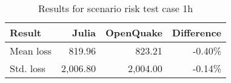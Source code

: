 \begin{table}[htbp]

\centering
\begin{tabular}{ l r r r }

\hline
\rowcolor{anti-flashwhite}
\bf{Result} & \bf{Julia} & \bf{OpenQuake} & \bf{Difference}\\
\hline
Mean loss & 819.96 & 823.21 & -0.40\% \\
Std. loss & 2,006.80 & 2,004.00 & -0.14\% \\
\hline
\end{tabular}

\caption{Results for scenario risk test case 1h}
\label{tab:result-sr-1h}
\end{table}